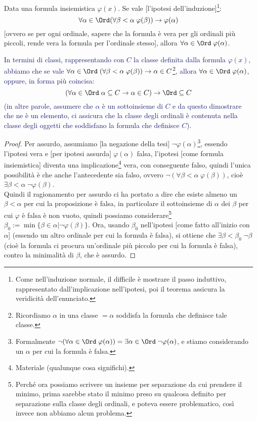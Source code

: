 \documentclass[11pt]{scrartcl}
\begin{document}
\begin{proposition}
	\label{induz_transf1}
	Data una formula insiemistica $\varphi(x)$. Se vale [l'ipotesi dell'induzione]\footnote{Come nell'induzione normale, il difficile è mostrare il passo induttivo, rappresentato dall'implicazione nell'ipotesi, poi il teorema assicura la veridicità dell'enunciato.}:
	\[ \forall \alpha \in \Ord(\forall \beta < \alpha \; \varphi(\beta))\rightarrow \varphi(\alpha)
		\]
	[ovvero se per ogni ordinale, sapere che la formula è vera per gli ordinali più piccoli, rende vera la formula per l'ordinale stesso], allora $\forall \alpha \in \Ord \; \varphi(\alpha)$.
\end{proposition}

\textcolor{MidnightBlue}{In termini di classi, rappresentando con $C$ la classe definita dalla formula $\varphi(x)$, abbiamo che se vale $\forall\alpha\in\Ord \;(\forall \beta < \alpha \; \varphi(\beta))\rightarrow \alpha \in C$\footnote{Ricordiamo
$\alpha$ in una classe $= \alpha$ soddisfa la formula che definisce tale classe.}, allora $\forall \alpha \in \Ord \; \varphi(\alpha)$, oppure, in forma più coincisa:
\[ (\forall \alpha \in \Ord \; \alpha \subseteq C \rightarrow \alpha \in C) \rightarrow \Ord \subseteq C
	\]
(in altre parole, assumere che $\alpha$ è un sottoinsieme di $C$ e da questo dimostrare che ne è un elemento, ci assicura che la classe degli ordinali è contenuta nella classe degli oggetti che soddisfano la formula che definisce $C$).}

\begin{proof}
	Per assurdo, assumiamo [la negazione della tesi] $\neg \varphi(\alpha)$\footnote{Formalmente $\neg(\forall \alpha \in\Ord\;\varphi(\alpha)) = \exists \alpha \in \Ord \;\neg\varphi(\alpha)$, e stiamo considerando un $\alpha$ per cui la formula è falsa.},
	essendo l'ipotesi vera e [per ipotesi assurda] $\varphi(\alpha)$ falsa, l'ipotesi [come formula insiemistica] diventa una implicazione\footnote{Materiale (qualunque cosa significhi).} vera, con conseguente falso, quindi l'unica possibilità è che anche l'antecedente sia falso,
	ovvero $\neg (\forall \beta < \alpha \; \varphi(\beta))$, cioè $\exists \beta < \alpha \; \neg \varphi(\beta)$.\\
	Quindi il ragionamento per assurdo ci ha portato a dire che esiste almeno un $\beta < \alpha$ per cui la proposizione è falsa, in particolare il sottoinsieme di $\alpha$ dei $\beta$ per cui $\varphi$ è falsa è non vuoto, quindi possiamo considerare\footnote{Perché
	ora possiamo scrivere un insieme per separazione da cui prendere il minimo, prima sarebbe stato il minimo preso su qualcosa definito per separazione sulla classe degli ordinali, e poteva essere problematico, così invece non abbiamo alcun problema.} $\beta_0 := \min \{\beta \in \alpha | \neg\varphi(\beta)\}$.
	Ora, usando $\beta_0$ nell'ipotesi [come fatto all'inizio con $\alpha$] (essendo un altro ordinale per cui la formula è falsa), si ottiene che $\exists \beta < \beta_0 \; \neg \beta$ (cioè la formula ci procura un'ordinale più piccolo per cui la formula è falsa), contro la minimalità di $\beta$, che è assurdo.
\end{proof}
\end{document}
